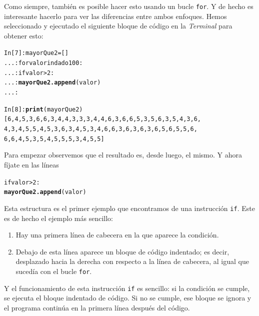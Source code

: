 \documentclass[10pt,a4paper]{article}\usepackage[]{graphicx}\usepackage[]{color}
\makeatletter
\newcommand{\hlkwd}[1]{\textcolor[rgb]{0.737,0.353,0.396}{\textbf{#1}}}%
\newenvironment{kframe}{%
 \def\at@end@of@kframe{}%
 \ifinner\ifhmode%
  \def\at@end@of@kframe{\end{minipage}}%
  \begin{minipage}{\columnwidth}%
 \fi\fi%
 \def\FrameCommand##1{\hskip\@totalleftmargin \hskip-\fboxsep
 \colorbox{shadecolor}{##1}\hskip-\fboxsep
     \hskip-\linewidth \hskip-\@totalleftmargin \hskip\columnwidth}%
 \MakeFramed {\advance\hsize-\width
   \@totalleftmargin\z@ \linewidth\hsize
   \@setminipage}}%
 {\par\unskip\endMakeFramed%
 \at@end@of@kframe}
\newenvironment{knitrout}{}{} %
\newcounter {cont01}
\makeatother
\begin{document}
Como siempre, también es posible hacer esto usando un bucle {\tt for}. Y de hecho es interesante hacerlo para ver las diferencias entre ambos enfoques. Hemos seleccionado y ejecutado el siguiente bloque de código en la {\em Terminal} para obtener esto:
\begin{knitrout}
\color{fgcolor}\begin{kframe}
\begin{alltt}
In [7]: mayorQue2 = []
   ...: for valor in dado100:
   ...:     if valor > 2:
   ...:         \hlkwd{mayorQue2.append}(valor)
   ...:

In [8]: \hlkwd{print}(mayorQue2)
[6, 4, 5, 3, 6, 6, 3, 4, 4, 3, 3, 3, 4, 4, 6, 3, 6, 6, 5, 3, 5, 6, 3, 5, 4, 3, 6,
4, 3, 4, 5, 5, 4, 5, 3, 6, 3, 4, 5, 3, 4, 6, 6, 3, 6, 3, 6, 3, 6, 5, 6, 5, 5, 6,
6, 6, 4, 5, 3, 5, 4, 5, 5, 5, 3, 4, 5, 5]
\end{alltt}
\end{kframe}
\end{knitrout}
Para empezar observemos que el resultado es, desde luego, el mismo. Y ahora fíjate en las líneas
\begin{knitrout}
\color{fgcolor}\begin{kframe}
\begin{alltt}
if valor > 2:
    \hlkwd{mayorQue2.append}(valor)
\end{alltt}
\end{kframe}
\end{knitrout}
Esta estructura es el primer ejemplo que encontramos de una {\sf instrucción} {\tt if}. Este es de hecho el ejemplo más sencillo:
\begin{enumerate}
\item Hay una primera línea de cabecera en la que aparece la condición.
\item Debajo de esta línea aparece un bloque de código indentado; es decir, desplazado hacia la derecha con respecto a la línea de cabecera, al igual que sucedía con el bucle {\tt for}.
\end{enumerate}
Y el funcionamiento de esta instrucción {\tt if} es sencillo: si la condición se cumple, se ejecuta el bloque indentado de código. Si no se cumple, ese bloque se ignora y el programa continúa en la primera línea después del código.
\end{document}
